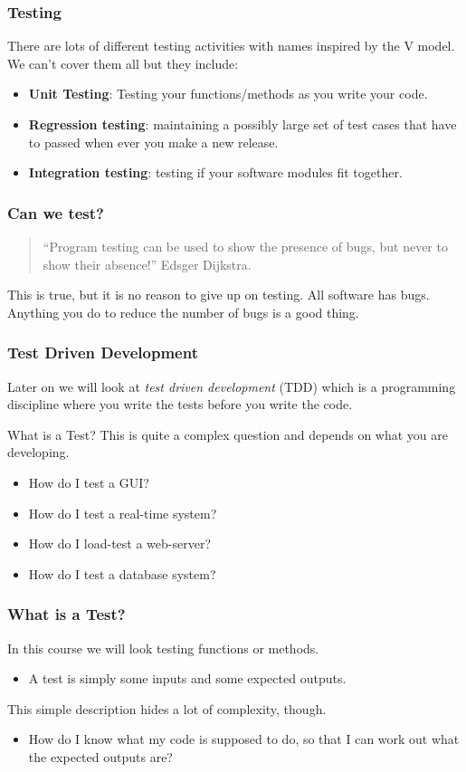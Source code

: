 \documentclass{beamer}
\begin{document}
\begin{frame}
  \frametitle{Testing} There are lots of different testing activities
  with names inspired by the V model.  We can't cover them all but
  they include:
  \begin{itemize}
  \item \textbf{Unit Testing}: Testing your functions/methods as you write your
    code.
  \item \textbf{Regression testing}: maintaining a possibly large set of test
    cases that have to passed when ever you make a new release.
  \item \textbf{Integration testing}: testing  if your software modules fit
    together. 
  \end{itemize}
\end{frame}
\begin{frame}
  \frametitle{Can we test?}
  
  \begin{quote}
    ``Program testing can be used to show the presence of bugs, but
    never to show their absence!'' Edsger Dijkstra.
  \end{quote}


This is true, but it is no reason to give up on testing. All software has
bugs. Anything you do to reduce the number of bugs is a good thing.
\end{frame}

\begin{frame}
  \frametitle{Test Driven Development}
  Later on we will look at \textit{test driven development} (TDD) which is a
  programming discipline where you write the tests before you write
  the code.
\end{frame}
\begin{frame}{What is a Test?}
  This is quite a complex question and depends on what you are
  developing.
  \begin{itemize}
  \item How do I test a GUI?
  \item How do I test a real-time system?
  \item How do I load-test a web-server?
  \item How do I test a database system?
  \end{itemize}

\end{frame}
\begin{frame}
  \frametitle{What is a Test?}
In this course we will look testing functions or methods. 
  \begin{itemize}
  \item A test is simply some inputs and some expected outputs.
  \end{itemize}
  This simple description hides a lot of complexity, though.
  \begin{itemize}
  \item How do I know what my code is supposed to do, so that I can
    work out what the expected outputs are?
  \end{itemize}
\end{frame}
\end{document}
